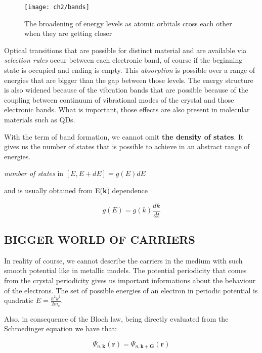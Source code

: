 \begin{figure}[H]
\centering
\texttt{[image: ch2/bands]}
\caption{The broadening of energy levels as atomic orbitals cross each other when they are getting closer\cite{fox}}
\end{figure}

Optical transitions that are possible for distinct material and are available via \textit{selection rules} occur between each electronic band, of course if the beginning state is occupied and ending is empty. This \textit{absorption} is possible over a range of energies that are bigger than the gap between those levels. The energy structure is also widened because of the vibration bands that are possible because of the coupling between continuum of vibrational modes of the crystal and those electronic bands. What is important, those effects are also present in molecular materials such as QDs.

With the term of band formation, we cannot omit \textbf{the density of states}. It gives us the number of states that is possible to achieve in an abstract range of energies.

\begin{center}
\textit{number of states} in $[E,E+dE] = g(E)dE$
\end{center}


and is usually obtained from E(\textbf{k}) dependence

\begin{equation}
g(E) = g(k)\frac{dk}{dt}
\end{equation}

\subsection{BIGGER WORLD OF CARRIERS}
In reality of course, we cannot describe the carriers in the medium with such smooth potential like in metallic models. The potential periodicity that comes from the crystal periodicity gives us important informations about the behaviour of the electrons. The set of possible energies of an electron in periodic potential is quadratic $E=\frac{\hbar ^2k^2}{2m_e}$.


Also, in consequence of the Bloch law, being directly evaluated from the Schroedinger equation we have that:

\begin{equation}
\Psi _{n,\mathbf{k}}(\mathbf{r}) = \Psi _{n,\mathbf{k}+\mathbf{G}}(\mathbf{r})
\end{equation}

